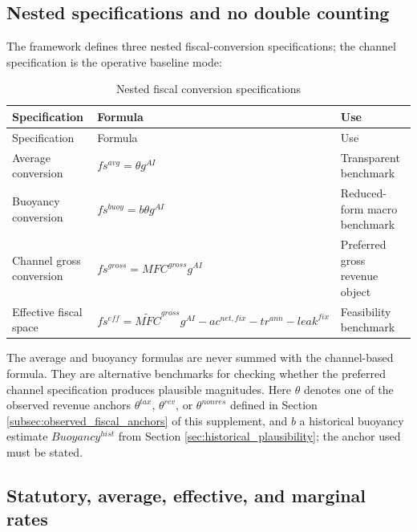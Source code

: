 \documentclass[11pt,a4paper]{article}
\begin{document}
\subsection{Nested specifications and no double counting}

The framework defines three nested fiscal-conversion specifications; the channel specification is the operative baseline mode:
\begin{longtable}{p{}p{}p{}}
\caption{Nested fiscal conversion specifications}\label{tab:fiscal_nested_specs}\\
\toprule
Specification & Formula & Use \\
\midrule
\endfirsthead
\toprule
Specification & Formula & Use \\
\midrule
\endhead
Average conversion & $fs^{avg}=\theta g^{AI}$ & Transparent benchmark \\
Buoyancy conversion & $fs^{buoy}=b\theta g^{AI}$ & Reduced-form macro benchmark \\
Channel gross conversion & $fs^{gross}=MFC^{gross}g^{AI}$ & Preferred gross revenue object \\
Effective fiscal space & $fs^{eff}=\widetilde{MFC}^{gross}g^{AI}-ac^{net,fix}-tr^{ann}-leak^{fix}$ & Feasibility benchmark \\
\bottomrule
\end{longtable}
The average and buoyancy formulas are never summed with the channel-based formula. They are alternative benchmarks for checking whether the preferred channel specification produces plausible magnitudes. Here $\theta$ denotes one of the observed revenue anchors $\theta^{tax}$, $\theta^{rev}$, or $\theta^{nonres}$ defined in Section \ref{subsec:observed_fiscal_anchors} of this supplement, and $b$ a historical buoyancy estimate $Buoyancy^{hist}$ from Section \ref{sec:historical_plausibility}; the anchor used must be stated.

\subsection{Statutory, average, effective, and marginal rates}
\end{document}
